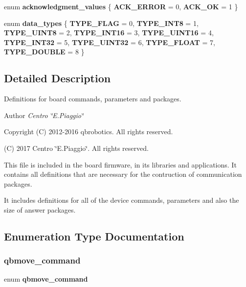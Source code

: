 \begin{DoxyCompactItemize}
\mbox{\label{commands_8h_a0eae1c82d20671c5d0b9b82b10070f1b}} 
enum {\bfseries acknowledgment\+\_\+values} \{ {\bfseries A\+C\+K\+\_\+\+E\+R\+R\+OR} = 0, 
{\bfseries A\+C\+K\+\_\+\+OK} = 1
 \}
\item 
\mbox{\label{commands_8h_aee7544e5fa6e2843ecdc3609602e56aa}} 
enum {\bfseries data\+\_\+types} \{ \newline
{\bfseries T\+Y\+P\+E\+\_\+\+F\+L\+AG} = 0, 
{\bfseries T\+Y\+P\+E\+\_\+\+I\+N\+T8} = 1, 
{\bfseries T\+Y\+P\+E\+\_\+\+U\+I\+N\+T8} = 2, 
{\bfseries T\+Y\+P\+E\+\_\+\+I\+N\+T16} = 3, 
\newline
{\bfseries T\+Y\+P\+E\+\_\+\+U\+I\+N\+T16} = 4, 
{\bfseries T\+Y\+P\+E\+\_\+\+I\+N\+T32} = 5, 
{\bfseries T\+Y\+P\+E\+\_\+\+U\+I\+N\+T32} = 6, 
{\bfseries T\+Y\+P\+E\+\_\+\+F\+L\+O\+AT} = 7, 
\newline
{\bfseries T\+Y\+P\+E\+\_\+\+D\+O\+U\+B\+LE} = 8
 \}
\end{DoxyCompactItemize}


\subsection{Detailed Description}
Definitions for board commands, parameters and packages. 

\begin{DoxyAuthor}{Author}
{\itshape Centro \char`\"{}\+E.\+Piaggio\char`\"{}} 
\end{DoxyAuthor}
\begin{DoxyCopyright}{Copyright}
(C) 2012-\/2016 qbrobotics. All rights reserved. 

(C) 2017 Centro \char`\"{}\+E.\+Piaggio\char`\"{}. All rights reserved.
\end{DoxyCopyright}
This file is included in the board firmware, in its libraries and applications. It contains all definitions that are necessary for the contruction of communication packages.

It includes definitions for all of the device commands, parameters and also the size of answer packages. 

\subsection{Enumeration Type Documentation}
\mbox{\label{commands_8h_abf0494aabdc65d654a54044eddc9210b}} 
\subsubsection{qbmove\+\_\+command}
{\footnotesize\ttfamily enum \textbf{ qbmove\+\_\+command}}

